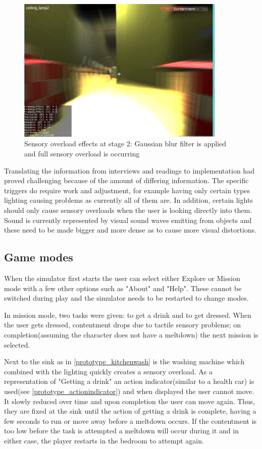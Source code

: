 \begin{figure}[H]
\centering
\includegraphics[width=100mm]{images/prototype/so_kitchen.png}
\caption{Sensory overload effects at stage 2: Gaussian blur filter is applied and full sensory overload is occurring}
\label{prototype_so2s2}
\end{figure}

Translating the information from interviews and readings to implementation had proved challenging because of the amount of differing information. The specific triggers do require work and adjustment, for example having only certain types lighting causing problems as currently all of them are. In addition, certain lights should only cause sensory overloads when the user is looking directly into them. Sound is currently represented by visual sound waves emitting from objects and these need to be made bigger and more dense as to cause more visual distortions.

\subsection*{Game modes}
When the simulator first starts the user can select either Explore or Mission mode with a few other options such as "About" and "Help". These cannot be switched during play and the simulator needs to be restarted to change modes. 

In mission mode, two tasks were given: to get a drink and to get dressed. When the user gets dressed, contentment drops due to tactile sensory problems; on completion(assuming the character does not have a meltdown) the next mission is selected. 

Next to the sink as in \ref{prototype_kitchenwash} is the washing machine which combined with the lighting quickly creates a sensory overload. As a representation of "Getting a drink" an action indicator(similar to a health car) is used(see \ref{prototype_actionindicator}) and when displayed the user cannot move. It slowly reduced over time and upon completion the user can move again. Thus, they are fixed at the sink until the action of getting a drink is complete, having a few seconds to run or move away before a meltdown occurs. If the contentment is too low before the task is attempted a meltdown will occur during it and in either case, the player restarts in the bedroom to attempt again. 

